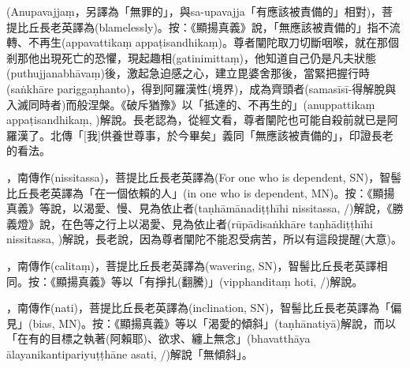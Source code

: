 \startitemgroup[noteitems]
\item{}(Anupavajjaṃ，另譯為「無罪的」，與sa-upavajja「有應該被責備的」相對)，菩提比丘長老英譯為(blamelessly)。按：《顯揚真義》說，「無應該被責備的」指不流轉、不再生(appavattikaṃ appaṭisandhikaṃ)。尊者闡陀取刀切斷咽喉，就在那個剎那他出現死亡的恐懼，現起趣相(gatinimittaṃ)，他知道自己仍是凡夫狀態(puthujjanabhāvaṃ)後，激起急迫感之心，建立毘婆舍那後，當緊把握行時(saṅkhāre pariggaṇhanto)，得到阿羅漢性(境界)，成為齊頭者(samasīsī-得解脫與入滅同時者)而般涅槃。《破斥猶豫》以「抵達的、不再生的」(anuppattikaṃ appaṭisandhikaṃ, )解說。長老認為，從經文看，尊者闡陀也可能自殺前就已是阿羅漢了。北傳「[我]供養世尊事，於今畢矣」義同「無應該被責備的」，印證長老的看法。
\stopitemgroup

\startitemgroup[noteitems]
\item{}，南傳作(nissitassa)，菩提比丘長老英譯為(For one who is dependent, SN)，智髻比丘長老英譯為「在一個依賴的人」(in one who is dependent, MN)。按：《顯揚真義》等說，以渴愛、慢、見為依止者(taṇhāmānadiṭṭhīhi nissitassa, /)解說，《勝義燈》說，在色等之行上以渴愛、見為依止者(rūpādisaṅkhāre taṇhādiṭṭhīhi nissitassa, )解說，長老說，因為尊者闡陀不能忍受病苦，所以有這段提醒(大意)。
\stopitemgroup

\startitemgroup[noteitems]
\item{}，南傳作(calitaṃ)，菩提比丘長老英譯為(wavering, SN)，智髻比丘長老英譯相同。按：《顯揚真義》等以「有掙扎(翻騰)」(vipphanditaṃ hoti, /)解說。
\stopitemgroup

\startitemgroup[noteitems]
\item{}，南傳作(nati)，菩提比丘長老英譯為(inclination, SN)，智髻比丘長老英譯為「偏見」(bias, MN)。按：《顯揚真義》等以「渴愛的傾斜」(taṇhānatiyā)解說，而以「在有的目標之執著(阿賴耶)、欲求、纏上無念」(bhavatthāya ālayanikantipariyuṭṭhāne asati, /)解說「無傾斜」。
\stopitemgroup

